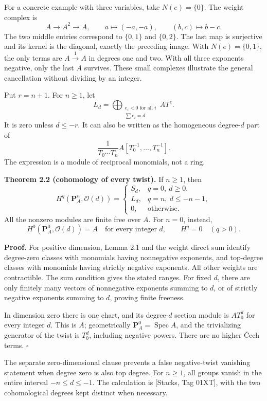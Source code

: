 \documentclass[11pt]{article}
\begin{document}
For a concrete example with three variables, take \(N(e)=\{0\}\). The
weight complex is \[
A\longrightarrow A^2\longrightarrow A,
\qquad a\longmapsto(-a,-a),\qquad(b,c)\longmapsto b-c.
\] The two middle entries correspond to \(\{0,1\}\) and \(\{0,2\}\). The
last map is surjective and its kernel is the diagonal, exactly the
preceding image. With \(N(e)=\{0,1\}\), the only terms are
\(A\xrightarrow{1}A\) in degrees one and two. With all three exponents
negative, only the last \(A\) survives. These small complexes illustrate
the general cancellation without dividing by an integer.

Put \(r=n+1\). For \(n\ge1\), let \[
L_d=\bigoplus_{\substack{e_i<0\text{ for all }i\\\sum e_i=d}} A T^e.
\] It is zero unless \(d\le-r\). It can also be written as the
homogeneous degree-\(d\) part of \[
\frac1{T_0\cdots T_n}A[T_0^{-1},\ldots,T_n^{-1}].
\] The expression is a module of reciprocal monomials, not a ring.

\textbf{Theorem 2.2 (cohomology of every twist).} If \(n\ge1\), then \[
H^q(\mathbf P_A^n,\mathcal O(d))=
\begin{cases}
S_d,&q=0,\ d\ge0,\\
L_d,&q=n,\ d\le-n-1,\\
0,&\text{otherwise}.
\end{cases}
\] All the nonzero modules are finite free over \(A\). For \(n=0\),
instead, \[
H^0(\mathbf P_A^0,\mathcal O(d))=A\quad\text{for every integer }d,
\qquad H^q=0\quad(q>0).
\]

\textbf{Proof.} For positive dimension, Lemma 2.1 and the weight direct
sum identify degree-zero classes with monomials having nonnegative
exponents, and top-degree classes with monomials having strictly
negative exponents. All other weights are contractible. The sum
condition gives the stated ranges. For fixed \(d\), there are only
finitely many vectors of nonnegative exponents summing to \(d\), or of
strictly negative exponents summing to \(d\), proving finite freeness.

In dimension zero there is one chart, and its degree-\(d\) section
module is \(A T_0^d\) for every integer \(d\). This is \(A\);
geometrically \(\mathbf P_A^0=\operatorname{Spec}A\), and the
trivializing generator of the twist is \(T_0^d\), including negative
powers. There are no higher Čech terms. \(\square\)

The separate zero-dimensional clause prevents a false negative-twist
vanishing statement when degree zero is also top degree. For \(n\ge1\),
all groups vanish in the entire interval \(-n\le d\le-1\). The
calculation is {[}Stacks, Tag 01XT{]}, with the two cohomological
degrees kept distinct when necessary.
\end{document}
